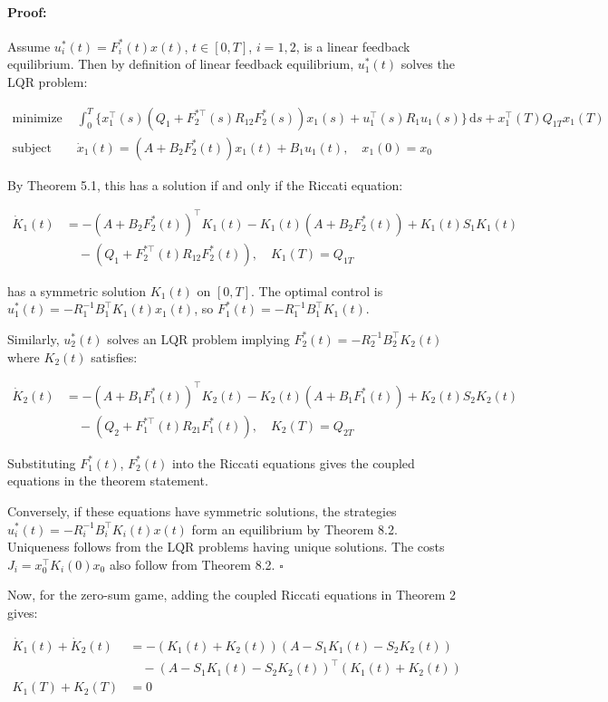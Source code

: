 \documentclass[3p]{elsarticle}
\newenvironment{proof}{\paragraph{Proof:}}{\hfill$\square$}
\begin{document}
\begin{proof}
Assume $u_i^*(t) = F_i^*(t) x(t)$, $t \in [0,T]$, $i=1,2$, is a linear feedback equilibrium. Then by definition of linear feedback equilibrium, $u_1^*(t)$ solves the LQR problem:

\begin{align*}
\text{minimize } & \int_0^T \{ x_1^\top(s) (Q_1 + F_{2}^{*\top}(s)R_{12}F_2^*(s)) x_1(s) + u_1^\top(s) R_1 u_1(s) \}\,\mathrm{d}s + x_1^\top(T) Q_{1T} x_1(T) \\
\text{subject to } & \dot{x}_1(t) = (A + B_2 F_2^*(t)) x_1(t) + B_1 u_1(t), \quad x_1(0) = x_0
\end{align*}

By Theorem 5.1, this has a solution if and only if the Riccati equation:

\begin{align*}
\dot{K}_1(t) &= -(A+B_2F_2^*(t))^\top K_1(t) - K_1(t)(A+B_2F_2^*(t)) + K_1(t)S_1K_1(t) \\
&\quad - (Q_1 + F_{2}^{*\top}(t)R_{12}F_2^*(t)), \quad K_1(T) = Q_{1T}  
\end{align*}

has a symmetric solution $K_1(t)$ on $[0,T]$. The optimal control is $u_1^*(t) = -R_1^{-1}B_1^\top K_1(t) x_1(t)$, so $F_1^*(t) = -R_1^{-1}B_1^\top K_1(t)$.

Similarly, $u_2^*(t)$ solves an LQR problem implying $F_2^*(t) = -R_2^{-1}B_2^\top K_2(t)$ where $K_2(t)$ satisfies: 

\begin{align*}
\dot{K}_2(t) &= -(A+B_1F_1^*(t))^\top K_2(t) - K_2(t)(A+B_1F_1^*(t)) + K_2(t)S_2K_2(t) \\  
&\quad - (Q_2 + F_{1}^{*\top}(t)R_{21}F_1^*(t)), \quad K_2(T) = Q_{2T}
\end{align*}

Substituting $F_1^*(t)$, $F_2^*(t)$ into the Riccati equations gives the coupled equations in the theorem statement.

Conversely, if these equations have symmetric solutions, the strategies $u_i^*(t) = -R_i^{-1}B_i^\top K_i(t) x(t)$ form an equilibrium by Theorem 8.2. Uniqueness follows from the LQR problems having unique solutions. The costs $J_i = x_0^\top K_i(0) x_0$ also follow from Theorem 8.2.
\end{proof}

Now, for the zero-sum game, adding the coupled Riccati equations in Theorem 2 gives:

\begin{align*}
\dot{K}_1(t) + \dot{K}_2(t) &= -(K_1(t) + K_2(t))(A - S_1K_1(t) - S_2K_2(t)) \\  
&\quad - (A - S_1K_1(t) - S_2K_2(t))^\top(K_1(t) + K_2(t)) \\
K_1(T) + K_2(T) &= 0
\end{align*}
\end{document}
